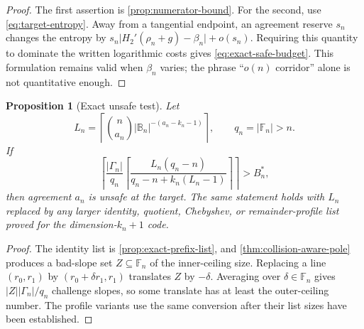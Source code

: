 \documentclass[12pt,a4paper]{amsart}
\numberwithin{equation}{section}
\newtheorem{proposition}[proposition]{Proposition}
\theoremstyle{remark}
\newcommand{\F}{\mathbb F}
\newcommand{\B}{\mathbb B}
\newcommand{\abs}[1]{\lvert #1\rvert}
\begin{document}
\begin{proof}
The first assertion is \cref{prop:numerator-bound}.  For the second, use
\eqref{eq:target-entropy}.  Away from a tangential endpoint, an agreement
reserve \(s_n\) changes the entropy by
\(s_n\abs{H_2'(\rho_n+g)-\beta_n}+o(s_n)\).  Requiring this quantity to
dominate the written logarithmic costs gives \eqref{eq:exact-safe-budget}.
This formulation remains valid when \(\beta_n\) varies; the phrase
``\(o(n)\) corridor'' alone is not quantitative enough.
\end{proof}

\begin{proposition}[Exact unsafe test]\label{prop:simple-pole-lower}
Let
\[
 L_n=\left\lceil
 \binom n{a_n}\abs{\B_n}^{-(a_n-k_n-1)}
 \right\rceil,
 \qquad q_n=\abs{\F_n}>n.
\]
If
\[
 \left\lceil \frac{\abs{\Gamma_n}}{q_n}
 \left\lceil
 \frac{L_n(q_n-n)}{q_n-n+k_n(L_n-1)}
 \right\rceil\right\rceil>B_n^*,
 \tag{13.3}\label{eq:exact-unsafe-budget}
\]
then agreement \(a_n\) is unsafe at the target.  The same statement holds
with \(L_n\) replaced by any larger identity, quotient, Chebyshev, or
remainder-profile list proved for the dimension-\(k_n+1\) code.
\end{proposition}

\begin{proof}
The identity list is \cref{prop:exact-prefix-list}, and
\cref{thm:collision-aware-pole} produces a bad-slope set \(Z\subseteq\F_n\)
of the inner-ceiling size.  Replacing a line \((r_0,r_1)\) by
\((r_0+\delta r_1,r_1)\) translates \(Z\) by \(-\delta\).  Averaging over
\(\delta\in\F_n\) gives \(\abs Z\abs{\Gamma_n}/q_n\) challenge slopes, so
some translate has at least the outer-ceiling number.  The profile variants
use the same conversion after their list sizes have been established.
\end{proof}
\end{document}
